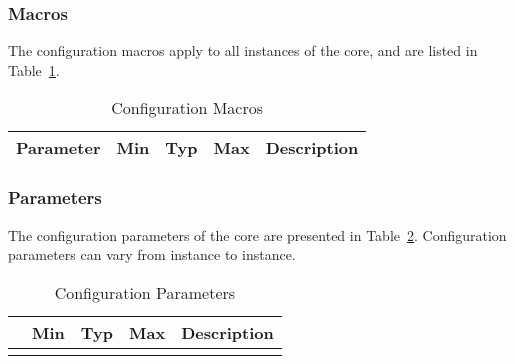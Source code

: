 \ifdefined\SM

\subsubsection{Macros}

The configuration macros apply to all instances of the core, and are listed in
Table~\ref{tab:sm}.

\begin{table}[h]
  \centering
    \begin{tabularx}{\textwidth}{ | c | c | c | c | X | }
    \hline
    \rowcolor{iob-green}
    {\bf Parameter} & {\bf Min} & {\bf Typ} & {\bf Max} & {\bf Description} \\\hline

    

    \end{tabularx}
  \caption{Configuration Macros}
  \label{tab:sm}
\end{table}

\noindent

\fi

\ifdefined\SP

\subsubsection{Parameters}
\label{sec:cp}

The configuration parameters of the core are presented in
Table~\ref{tab:sp}. Configuration parameters can vary from instance to instance. \\

\begin{longtable}{|l|c|c|c|p{9cm}|}
    \hline
    \rowcolor{iob-green}
    \multicolumn{1}{|c}{\bf Parameter} & \multicolumn{1}{|c|}{\bf Min} & \multicolumn{1}{c|}{\bf Typ} & \multicolumn{1}{c|}{\bf Max} & \multicolumn{1}{c|}{\bf Description}  \\ \hline \hline

    
    
\caption{Configuration Parameters}
  \label{tab:sp}
\end{longtable}

\fi
